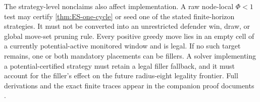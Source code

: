 The strategy-level nonclaims also affect implementation.  A raw node-local
$\Phi<1$ test may certify \cref{thm:ES-one-cycle} or seed one of the stated
finite-horizon strategies.  It must not be converted into an unrestricted
defender win, draw, or global move-set pruning rule.  Every positive greedy
move lies in an empty cell of a currently potential-active monitored window and
is legal.  If no such target remains, one or both mandatory placements can be
fillers.  A solver implementing a potential-certified strategy must retain a
legal filler fallback, and it must account for the filler's effect on the
future radius-eight legality frontier.  Full derivations and the exact finite
traces appear in the companion proof documents \cite{hexobot-companions}.
